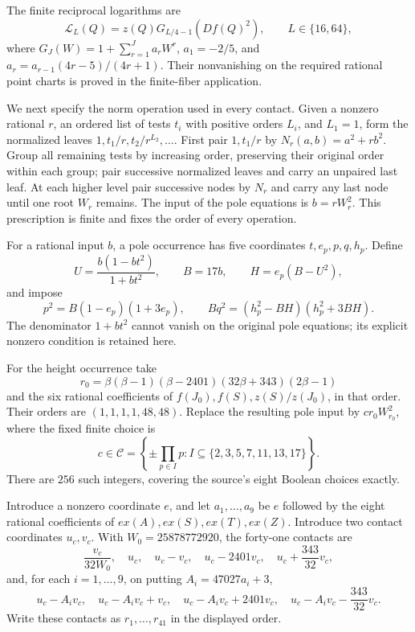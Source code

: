 The finite reciprocal logarithms are
\[
 \mathcal L_L(Q)=z(Q)G_{L/4-1}(Df(Q)^2),
 \qquad L\in\{16,64\},
\]
where $G_J(W)=1+\sum_{r=1}^J a_rW^r$,
$a_1=-2/5$, and $a_r=a_{r-1}(4r-5)/(4r+1)$.
Their nonvanishing on the required rational point charts is proved
in the finite-fiber application.

We next specify the norm operation used in every contact. Given a
nonzero rational $r$, an ordered list of tests $t_i$ with positive
orders $L_i$, and $L_1=1$, form the normalized leaves
$1,t_1/r,t_2/r^{L_2},\ldots$. First pair $1,t_1/r$ by
$N_r(a,b)=a^2+rb^2$. Group all remaining tests by increasing order,
preserving their original order within each group; pair successive
normalized leaves and carry an unpaired last leaf. At each higher
level pair successive nodes by $N_r$ and carry any last node until
one root $W_r$ remains. The input of the pole equations is $b=rW_r^2$.
This prescription is finite and fixes the order of every operation.

For a rational input $b$, a pole occurrence has five coordinates
$t,e_p,p,q,h_p$. Define
\[
 U=\frac{b(1-bt^2)}{1+bt^2},\qquad B=17b,
 \qquad H=e_p(B-U^2),
\]
and impose
\begin{equation}\label{eq:circuit-pole}
 p^2=B(1-e_p)(1+3e_p),\qquad
 Bq^2=(h_p^2-BH)(h_p^2+3BH).
\end{equation}
The denominator $1+bt^2$ cannot vanish on the original pole equations;
its explicit nonzero condition is retained here.

For the height occurrence take
\[
 r_0=\beta(\beta-1)(\beta-2401)(32\beta+343)(2\beta-1)
\]
and the six rational coefficients of
$f(J_0),f(S),z(S)/z(J_0)$, in that order. Their orders are
$(1,1,1,1,48,48)$. Replace the resulting pole input by $c r_0W_{r_0}^2$,
where the fixed finite choice is
\[
 c\in\mathcal C=\left\{\pm\prod_{p\in I}p:
 I\subseteq\{2,3,5,7,11,13,17\}\right\}.
\]
There are $256$ such integers, covering the source's eight Boolean
choices exactly.

Introduce a nonzero coordinate $e$, and let $a_1,\ldots,a_9$ be
$e$ followed by the eight rational coefficients of
$ex(A),ex(S),ex(T),ex(Z)$. Introduce two contact coordinates $u_c,v_c$.
With $W_0=25878772920$, the forty-one contacts are
\[
 \frac{v_c}{32W_0},\quad u_c,\quad u_c-v_c,\quad
 u_c-2401v_c,\quad u_c+\frac{343}{32}v_c,
\]
and, for each $i=1,\ldots,9$, on putting $A_i=47027a_i+3$,
\[
 u_c-A_iv_c,\quad u_c-A_iv_c+v_c,\quad
 u_c-A_iv_c+2401v_c,\quad
 u_c-A_iv_c-\frac{343}{32}v_c.
\]
Write these contacts as $r_1,\ldots,r_{41}$ in the displayed order.


